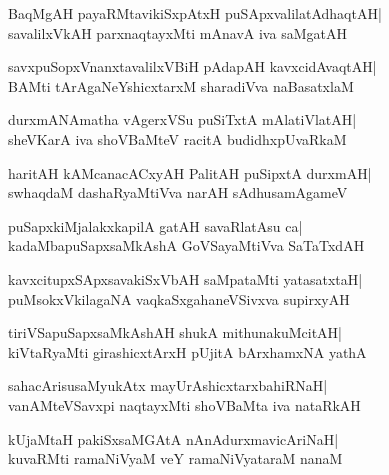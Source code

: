 \documentclass[twoside,12pt,openright]{book}
\newcounter{shloka}[chapter]
\begin{document}
\begin{shloka}%
BaqMgAH payaRMtavikiSxpAtxH puSApxvalilatAdhaqtAH|\\
savalilxVkAH parxnaqtayxMti mAnavA iva saMgatAH
\end{shloka}

\begin{shloka}%
savxpuSopxVnanxtavalilxVBiH pAdapAH kavxcidAvaqtAH|\\
BAMti tArAgaNeYshicxtarxM sharadiVva naBasatxlaM
\end{shloka}

\begin{shloka}%
durxmANAmatha vAgerxVSu puSiTxtA mAlatiVlatAH|\\
sheVKarA iva shoVBaMteV racitA budidhxpUvaRkaM
\end{shloka}

\begin{shloka}%
haritAH kAMcanacACxyAH PalitAH puSipxtA durxmAH|\\
swhaqdaM dashaRyaMtiVva narAH sAdhusamAgameV
\end{shloka}

\begin{shloka}%
puSapxkiMjalakxkapilA gatAH savaRlatAsu ca|\\
kadaMbapuSapxsaMkAshA GoVSayaMtiVva SaTaTxdAH
\end{shloka}

\begin{shloka}%
kavxcitupxSApxsavakiSxVbAH saMpataMti yatasatxtaH|\\
puMsokxVkilagaNA vaqkaSxgahaneVSivxva supirxyAH
\end{shloka}

\begin{shloka}%
  tiriVSapuSapxsaMkAshAH shukA mithunakuMcitAH|\\
kiVtaRyaMti girashicxtArxH pUjitA bArxhamxNA yathA
\end{shloka}

\begin{shloka}%
sahacArisusaMyukAtx mayUrAshicxtarxbahiRNaH|\\
vanAMteVSavxpi naqtayxMti shoVBaMta iva nataRkAH
\end{shloka}

\begin{shloka}%
kUjaMtaH pakiSxsaMGAtA nAnAdurxmavicAriNaH|\\
kuvaRMti ramaNiVyaM veY ramaNiVyataraM nanaM
\end{shloka}
\end{document}
